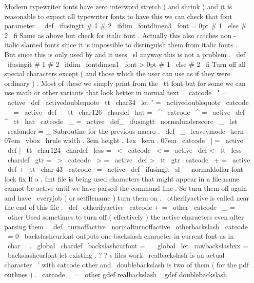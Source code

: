 {{{{Modern
typewriter
fonts
have
zero
%
interword
stretch
(
and
shrink
)
and
it
is
reasonable
to
expect
all
%
typewriter
fonts
to
have
this
we
can
check
that
font
parameter
.
%
\
def
\
ifusingtt
#
1
#
2
{
\
ifdim
\
fontdimen3
\
font
=
0pt
#
1
\
else
#
2
\
fi
}
%
Same
as
above
but
check
for
italic
font
.
Actually
this
also
catches
%
non
-
italic
slanted
fonts
since
it
is
impossible
to
distinguish
them
from
%
italic
fonts
.
But
since
this
is
only
used
by
and
it
uses
\
sl
anyway
%
this
is
not
a
problem
.
\
def
\
ifusingit
#
1
#
2
{
\
ifdim
\
fontdimen1
\
font
>
0pt
#
1
\
else
#
2
\
fi
}
%
Turn
off
all
special
characters
except
%
(
and
those
which
the
user
can
use
as
if
they
were
ordinary
)
.
%
Most
of
these
we
simply
print
from
the
\
tt
font
but
for
some
we
can
%
use
math
or
other
variants
that
look
better
in
normal
text
.
\
catcode
\
"
=
\
active
\
def
\
activedoublequote
{
{
\
tt
\
char34
}
}
\
let
"
=
\
activedoublequote
\
catcode
\
~
=
\
active
\
def
~
{
{
\
tt
\
char126
}
}
\
chardef
\
hat
=
\
^
\
catcode
\
^
=
\
active
\
def
^
{
{
\
tt
\
hat
}
}
\
catcode
\
_
=
\
active
\
def_
{
\
ifusingtt
\
normalunderscore
\
_
}
\
let
\
realunder
=
_
%
Subroutine
for
the
previous
macro
.
\
def
\
_
{
\
leavevmode
\
kern
.
07em
\
vbox
{
\
hrule
width
.
3em
height
.
1ex
}
\
kern
.
07em
}
\
catcode
\
|
=
\
active
\
def
|
{
{
\
tt
\
char124
}
}
\
chardef
\
less
=
\
<
\
catcode
\
<
=
\
active
\
def
<
{
{
\
tt
\
less
}
}
\
chardef
\
gtr
=
\
>
\
catcode
\
>
=
\
active
\
def
>
{
{
\
tt
\
gtr
}
}
\
catcode
\
+
=
\
active
\
def
+
{
{
\
tt
\
char
43
}
}
\
catcode
\
=
\
active
\
def
{
\
ifusingit
{
{
\
sl
\
}
}
\
normaldollar
}
%
font
-
lock
fix
%
If
a
.
fmt
file
is
being
used
characters
that
might
appear
in
a
file
%
name
cannot
be
active
until
we
have
parsed
the
command
line
.
%
So
turn
them
off
again
and
have
\
everyjob
(
or
setfilename
)
turn
them
on
.
%
\
otherifyactive
is
called
near
the
end
of
this
file
.
\
def
\
otherifyactive
{
\
catcode
+
=
\
other
\
catcode
\
_
=
\
other
}
%
Used
sometimes
to
turn
off
(
effectively
)
the
active
characters
even
after
%
parsing
them
.
\
def
\
turnoffactive
{
%
\
normalturnoffactive
\
otherbackslash
}
\
catcode
\
=
0
%
\
backslashcurfont
outputs
one
backslash
character
in
current
font
%
as
in
\
char
\
\
.
\
global
\
chardef
\
backslashcurfont
=
\
\
\
global
\
let
\
rawbackslashxx
=
\
backslashcurfont
%
let
existing
.
?
?
s
files
work
%
\
realbackslash
is
an
actual
character
\
'
with
catcode
other
and
%
\
doublebackslash
is
two
of
them
(
for
the
pdf
outlines
)
.
{
\
catcode
\
\
=
\
other
gdef
realbackslash
{
\
}
gdef
doublebackslash
{
\
\
}
}
}}}}
